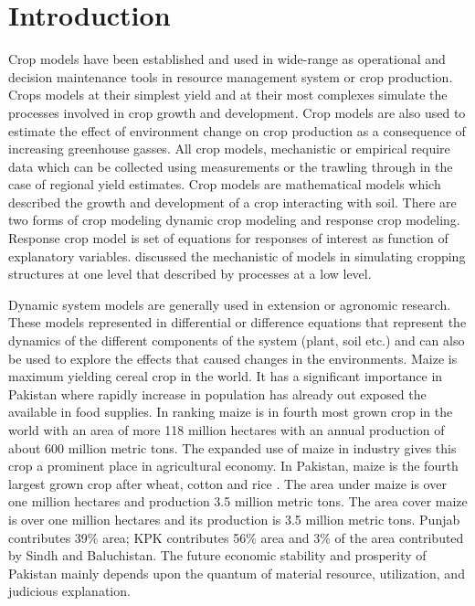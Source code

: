\section{Introduction}
Crop models have been established and used in wide-range as operational and decision maintenance tools in resource management system or crop production. Crops models at their simplest yield and at their most complexes simulate the processes involved in crop growth and development. Crop models are also used to estimate the effect of environment change on crop production as a consequence of increasing greenhouse gasses. All crop models, mechanistic or empirical require data which can be collected using measurements or the trawling through in the case of regional yield estimates. Crop models are mathematical models which described the growth and development of a crop interacting with soil. There are two forms of crop modeling dynamic crop modeling and response crop modeling. Response crop model is set of equations for responses of interest as function of explanatory variables. \citet{Loomis1968} discussed the mechanistic of models in simulating cropping structures at one level that described by processes at a low level.

  Dynamic system models are generally used in extension or agronomic research. These models represented in differential or difference equations that represent the dynamics of the different components of the system (plant, soil etc.) and can also be used to explore the effects that caused changes in the environments.
Maize is maximum yielding cereal crop in the world. It has a significant importance in Pakistan where rapidly increase in population has already out exposed the available in food supplies. In ranking maize is in fourth most grown crop in the world with an area of more 118 million hectares with an annual production of about 600 million metric tons. The expanded use of maize in industry gives this crop a prominent place in agricultural economy. In Pakistan, maize is the fourth largest grown crop after wheat, cotton and rice \citep{RasheedAliMahmood2004}. The area under maize is over one million hectares and production 3.5 million metric tons. The area cover maize is over one million hectares and its production is 3.5 million metric tons. Punjab contributes 39\% area; KPK contributes 56\% area and 3\% of the area contributed by Sindh and Baluchistan.  The future economic stability and prosperity of Pakistan mainly depends upon the quantum of material resource, utilization, and judicious explanation.

